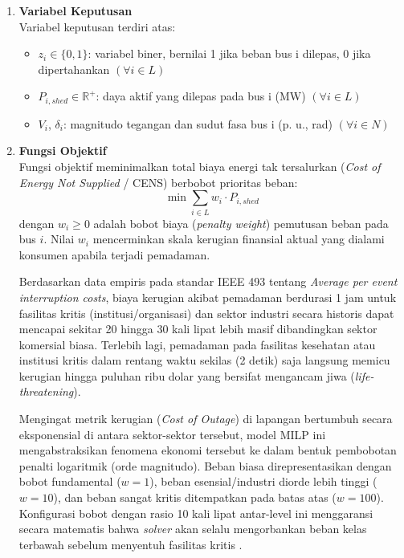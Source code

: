 \begin{enumerate}
\item[a.]{\textbf{Variabel Keputusan}}\\
Variabel keputusan terdiri atas:
\begin{itemize}
    \item[i.] $z_{i}\in\{0,1\}$: variabel biner, bernilai 1 jika beban bus i dilepas, 0 jika dipertahankan $(\forall i\in L)$
    \item[ii.] $P_{i,shed}\in\mathbb{R}^{+}$: daya aktif yang dilepas pada bus i (MW) $(\forall i\in L)$
    \item[iii.] $V_{i}$, $\delta_{i}$: magnitudo tegangan dan sudut fasa bus i (p. u., rad) $(\forall i\in N)$
\end{itemize}

\item[b.]{\textbf{Fungsi Objektif}}\\
Fungsi objektif meminimalkan total biaya energi tak tersalurkan (\textit{Cost of Energy Not Supplied} / CENS) berbobot prioritas beban:
\begin{equation}
    \min \sum_{i\in L}w_{i}\cdot P_{i,shed}
\end{equation}
dengan $w_{i}\ge0$ adalah bobot biaya (\textit{penalty weight}) pemutusan beban pada bus $i$. Nilai $w_{i}$ mencerminkan skala kerugian finansial aktual yang dialami konsumen apabila terjadi pemadaman. 

Berdasarkan data empiris pada standar IEEE 493 \cite{ieee493} tentang \textit{Average per event interruption costs}, biaya kerugian akibat pemadaman berdurasi 1 jam untuk fasilitas kritis (institusi/organisasi) dan sektor industri secara historis dapat mencapai sekitar 20 hingga 30 kali lipat lebih masif dibandingkan sektor komersial biasa. Terlebih lagi, pemadaman pada fasilitas kesehatan atau institusi kritis dalam rentang waktu sekilas (2 detik) saja langsung memicu kerugian hingga puluhan ribu dolar yang bersifat mengancam jiwa (\textit{life-threatening}).

Mengingat metrik kerugian (\textit{Cost of Outage}) di lapangan bertumbuh secara eksponensial di antara sektor-sektor tersebut, model MILP ini mengabstraksikan fenomena ekonomi tersebut ke dalam bentuk pembobotan penalti logaritmik (orde magnitudo). Beban biasa direpresentasikan dengan bobot fundamental ($w=1$), beban esensial/industri diorde lebih tinggi ($w=10$), dan beban sangat kritis ditempatkan pada batas atas ($w=100$). Konfigurasi bobot dengan rasio 10 kali lipat antar-level ini menggaransi secara matematis bahwa \textit{solver} akan selalu mengorbankan beban kelas terbawah sebelum menyentuh fasilitas kritis \cite{IEEE1512_2023, Elsaadany2025}.


\end{enumerate}
